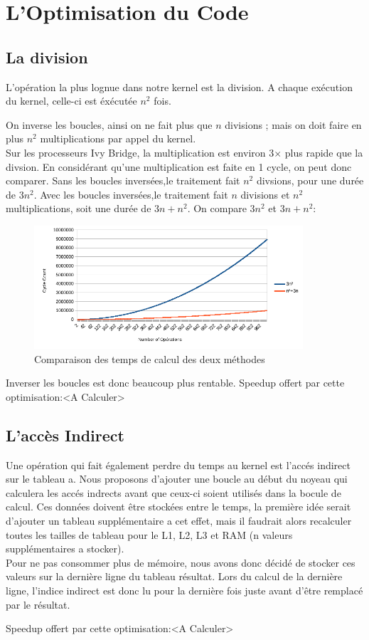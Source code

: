 
\chapter*{L'Optimisation du Code}
\section*{La division}

L'opération la plus lognue dans notre kernel est la division. A chaque exécution du kernel, celle-ci est éxécutée $n^2$ fois.

On inverse les boucles, ainsi on ne fait plus que $n$ divisions ; mais on doit faire en plus $n^2$ multiplications par appel du kernel.
\\Sur les processeurs Ivy Bridge, la multiplication est environ 3$\times$ plus rapide que la divsion. En considérant qu'une multiplication est faite en 1 cycle, on peut donc comparer.
Sans les boucles inversées,le traitement fait $n^2$ divsions, pour une durée de $3n^2$.
Avec les boucles inversées,le traitement fait $n$ divisions et $n^2$ multiplications, soit une durée de $3n+n^2$.
On compare $3n^2$ et $3n+n^2$:\\
\begin{figure}[ht!]
    \centering
    \includegraphics[width=100mm]{MEDIA/div_vs_mult_graph.png}
    \caption{Comparaison des temps de calcul des deux méthodes}
\end{figure}
Inverser les boucles est donc beaucoup plus rentable.
Speedup offert par cette optimisation:<A Calculer>

\section*{L'accès Indirect}

Une opération qui fait également perdre du temps au kernel est l'accés indirect sur le tableau a.
Nous proposons d'ajouter une boucle au début du noyeau qui calculera les accés indrects avant que ceux-ci soient utilisés dans la bocule de calcul.
Ces données doivent être stockées entre le temps, la première idée serait d'ajouter un tableau supplémentaire a cet effet, mais il faudrait alors recalculer toutes les tailles de tableau pour le L1, L2, L3 et RAM (n valeurs supplémentaires a stocker).\\

Pour ne pas consommer plus de mémoire, nous avons donc décidé de stocker ces valeurs sur la dernière ligne du tableau résultat.
Lors du calcul de la dernière ligne, l'indice indirect est donc lu pour la dernière fois juste avant d'être remplacé par le résultat. 

Speedup offert par cette optimisation:<A Calculer>


